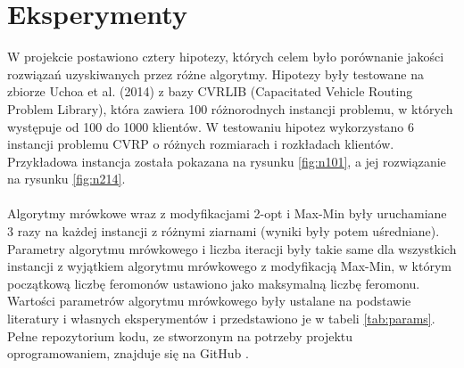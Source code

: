\documentclass{article}
\begin{document}
\section{Eksperymenty}
W projekcie postawiono cztery hipotezy, których celem było porównanie jakości rozwiązań uzyskiwanych przez różne algorytmy. Hipotezy były testowane na zbiorze Uchoa et al. (2014) \cite{Uchoa} z bazy CVRLIB (Capacitated Vehicle Routing Problem Library), która zawiera 100 różnorodnych instancji problemu, w których występuje od 100 do 1000 klientów. W testowaniu hipotez wykorzystano 6 instancji problemu CVRP o różnych rozmiarach i rozkładach klientów. Przykładowa instancja została pokazana na rysunku \ref{fig:n101}, a jej rozwiązanie na rysunku \ref{fig:n214}. 
\\ \\
Algorytmy mrówkowe wraz z modyfikacjami 2-opt i Max-Min były uruchamiane 3 razy na każdej instancji z różnymi ziarnami (wyniki były potem uśredniane). Parametry algorytmu mrówkowego i liczba iteracji były takie same dla wszystkich instancji z wyjątkiem algorytmu mrówkowego z modyfikacją Max-Min, w którym początkową liczbę feromonów ustawiono jako maksymalną liczbę feromonu. Wartości parametrów algorytmu mrówkowego były ustalane na podstawie literatury i własnych eksperymentów i przedstawiono je w tabeli \ref{tab:params}. Pełne repozytorium kodu, ze stworzonym na potrzeby projektu oprogramowaniem, znajduje się na GitHub \cite{msi2ants}.
\end{document}
